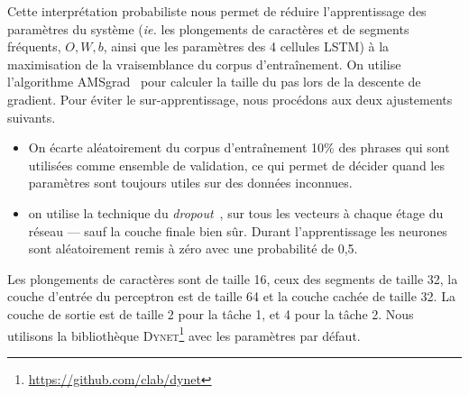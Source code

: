 Cette interprétation probabiliste nous permet de réduire l'apprentissage des paramètres du système (\emph{ie.} les plongements de caractères et de segments fréquents, $O,W,b$, ainsi que les paramètres des 4 cellules LSTM) à la maximisation de la vraisemblance du corpus d'entraînement.
On utilise l'algorithme AMSgrad~\cite{reddi2018on} pour  calculer la taille du pas lors de la descente de gradient.
Pour éviter le sur-apprentissage, nous  procédons aux deux ajustements suivants.
\begin{itemize}
\item On écarte aléatoirement du corpus d'entraînement 10\% des phrases qui sont utilisées comme ensemble de validation, ce qui permet de décider quand les paramètres sont toujours utiles sur des données inconnues.
\item on utilise la technique du \emph{dropout}~\cite{srivastava2014dropout}, sur tous les vecteurs à chaque étage du réseau --- sauf la couche finale bien sûr.
  Durant l'apprentissage les neurones sont aléatoirement remis à zéro avec une probabilité de 0,5.

\end{itemize}

Les plongements de caractères sont de taille 16, ceux des segments de taille 32, la couche d'entrée du perceptron est de taille 64 et la couche cachée de taille 32.
La couche de sortie est de taille 2 pour la tâche 1, et 4 pour la tâche 2.
Nous utilisons la bibliothèque \textsc{Dynet}\footnote{\url{https://github.com/clab/dynet}} avec les paramètres par défaut.

